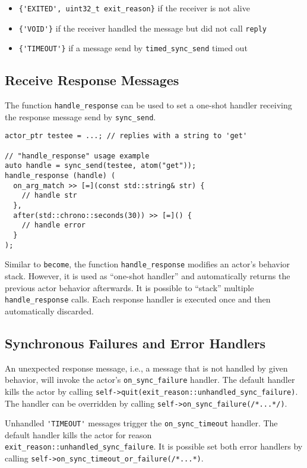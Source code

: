 \begin{itemize}
\item \lstinline^{'EXITED', uint32_t exit_reason}^ if the receiver is not alive
\item \lstinline^{'VOID'}^ if the receiver handled the message but did not call \lstinline^reply^
\item \lstinline^{'TIMEOUT'}^ if a message send by \lstinline^timed_sync_send^ timed out
\end{itemize}

\clearpage
\subsection{Receive Response Messages}

The function \lstinline^handle_response^ can be used to set a one-shot handler receiving the response message send by \lstinline^sync_send^.

\begin{lstlisting}
actor_ptr testee = ...; // replies with a string to 'get'

// "handle_response" usage example
auto handle = sync_send(testee, atom("get"));
handle_response (handle) (
  on_arg_match >> [=](const std::string& str) {
    // handle str
  },
  after(std::chrono::seconds(30)) >> [=]() {
    // handle error
  }
);
\end{lstlisting}

Similar to \lstinline^become^, the function \lstinline^handle_response^ modifies an actor's behavior stack.
However, it is used as ``one-shot handler'' and automatically returns the previous actor behavior afterwards.
It is possible to ``stack'' multiple \lstinline^handle_response^ calls.
Each response handler is executed once and then automatically discarded.

\subsection{Synchronous Failures and Error Handlers}

An unexpected response message, i.e., a message that is not handled by given behavior, will invoke the actor's \lstinline^on_sync_failure^ handler.
The default handler kills the actor by calling \lstinline^self->quit(exit_reason::unhandled_sync_failure)^.
The handler can be overridden by calling \lstinline^self->on_sync_failure(/*...*/)^.

Unhandled \lstinline^'TIMEOUT'^ messages trigger the \lstinline^on_sync_timeout^ handler.
The default handler kills the actor for reason \lstinline^exit_reason::unhandled_sync_failure^.
It is possible set both error handlers by calling \lstinline^self->on_sync_timeout_or_failure(/*...*)^.


